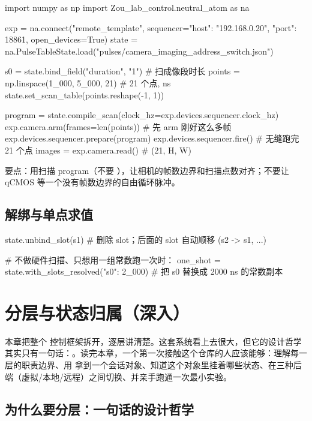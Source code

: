 \documentclass[11pt,oneside,openany]{book}
\begin{document}
\begin{codeblock}[Python]
import numpy as np
import Zou_lab_control.neutral_atom as na

exp = na.connect("remote_template", sequencer={"host": "192.168.0.20", "port": 18861}, open_devices=True)
state = na.PulseTableState.load("pulses/camera_imaging_address_switch.json")

s0 = state.bind_field("duration", "1")               # 扫成像段时长
points = np.linspace(1_000, 5_000, 21)               # 21 个点, ns
state.set_scan_table(points.reshape(-1, 1))

program = state.compile_scan(clock_hz=exp.devices.sequencer.clock_hz)
exp.camera.arm(frames=len(points))                   # 先 arm 刚好这么多帧
exp.devices.sequencer.prepare(program)
exp.devices.sequencer.fire()                         # 无缝跑完 21 个点
images = exp.camera.read()                           # (21, H, W)
\end{codeblock}

要点：用扫描 program（不要 ），让相机的帧数边界和扫描点数对齐；不要让 qCMOS 等一个没有帧数边界的自由循环脉冲。

\section{解绑与单点求值}
\begin{codeblock}[Python]
state.unbind_slot(s1)                 # 删除 slot；后面的 slot 自动顺移 (s2 -> s1, ...)

# 不做硬件扫描、只想用一组常数跑一次时：
one_shot = state.with_slots_resolved({"s0": 2_000})   # 把 s0 替换成 2000 ns 的常数副本
\end{codeblock}

\chapter{分层与状态归属（深入）}

本章把整个  控制框架拆开，逐层讲清楚。这套系统看上去很大，但它的设计哲学其实只有一句话：。读完本章，一个第一次接触这个仓库的人应该能够：理解每一层的职责边界、用  拿到一个会话对象、知道这个对象里挂着哪些状态、在三种后端（虚拟/本地/远程）之间切换、并亲手跑通一次最小实验。

\section{为什么要分层：一句话的设计哲学}
\end{document}

